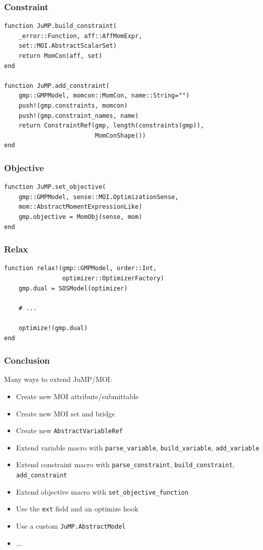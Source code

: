\documentclass{beamer}
\begin{document}
\begin{frame}[fragile]
  \frametitle{Constraint}
  \begin{verbatim}
function JuMP.build_constraint(
    _error::Function, aff::AffMomExpr,
    set::MOI.AbstractScalarSet)
    return MomCon(aff, set)
end

function JuMP.add_constraint(
    gmp::GMPModel, momcon::MomCon, name::String="")
    push!(gmp.constraints, momcon)
    push!(gmp.constraint_names, name)
    return ConstraintRef(gmp, length(constraints(gmp)),
                         MomConShape())
end
  \end{verbatim}
\end{frame}

\begin{frame}[fragile]
  \frametitle{Objective}
  \begin{verbatim}
function JuMP.set_objective(
    gmp::GMPModel, sense::MOI.OptimizationSense,
    mom::AbstractMomentExpressionLike)
    gmp.objective = MomObj(sense, mom)
end
  \end{verbatim}
\end{frame}

\begin{frame}[fragile]
  \frametitle{Relax}
  \begin{verbatim}
function relax!(gmp::GMPModel, order::Int,
                optimizer::OptimizerFactory)
    gmp.dual = SOSModel(optimizer)

    # ...

    optimize!(gmp.dual)
end
  \end{verbatim}
\end{frame}

\begin{frame}[fragile]
  \frametitle{Conclusion}
  Many ways to extend JuMP/MOI:
  \begin{itemize}
    \item Create new MOI attribute/submittable
    \item Create new MOI set and bridge
    \item Create new \verb|AbstractVariableRef|
    \item Extend variable macro with \verb|parse_variable|, \verb|build_variable|, \verb|add_variable|
    \item Extend constraint macro with \verb|parse_constraint|, \verb|build_constraint|, \verb|add_constraint|
    \item Extend objective macro with \verb|set_objective_function|
    \item Use the \verb|ext| field and an optimize hook
    \item Use a custom \verb|JuMP.AbstractModel|
    \item ...
  \end{itemize}
\end{frame}
\end{document}
